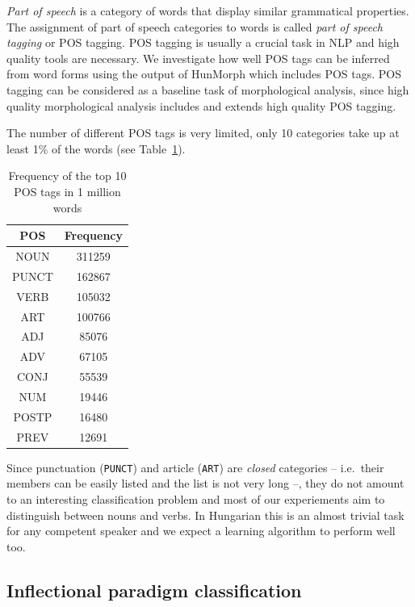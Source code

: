\documentclass{article}
\begin{document}
\emph{Part of speech} is a category of words that display similar grammatical properties.
The assignment of part of speech categories to words is called \emph{part of speech tagging} or {POS tagging}.
POS tagging is usually a crucial task in NLP and high quality tools are necessary.
We investigate how well POS tags can be inferred from word forms using the output of HunMorph which includes POS tags.
POS tagging can be considered as a baseline task of morphological analysis, since high quality morphological analysis includes and extends high quality POS tagging.

The number of different POS tags is very limited, only 10 categories take up at least 1\% of the words (see Table~\ref{table:pos-tags}).

\begin{table}[t]
  \caption{Frequency of the top 10 POS tags in 1 million words}
  \label{table:pos-tags}
  \centering
  \begin{tabular}{cc}
      \toprule
      POS & Frequency \\
      \midrule
      NOUN & 311259 \\
      PUNCT & 162867 \\
      VERB & 105032 \\
      ART & 100766 \\
      ADJ & 85076 \\
      ADV & 67105 \\
      CONJ & 55539 \\
      NUM & 19446 \\
      POSTP & 16480 \\
      PREV & 12691 \\
      \bottomrule
  \end{tabular}
\end{table}

Since punctuation (\texttt{PUNCT}) and article (\texttt{ART}) are \emph{closed} categories -- i.e.~their members can be easily listed and the list is not very long --, they do not amount to an interesting classification problem and most of our experiements aim to distinguish between nouns and verbs.
In Hungarian this is an almost trivial task for any competent speaker and we expect a learning algorithm to perform well too.

\subsection{Inflectional paradigm classification}
\end{document}
